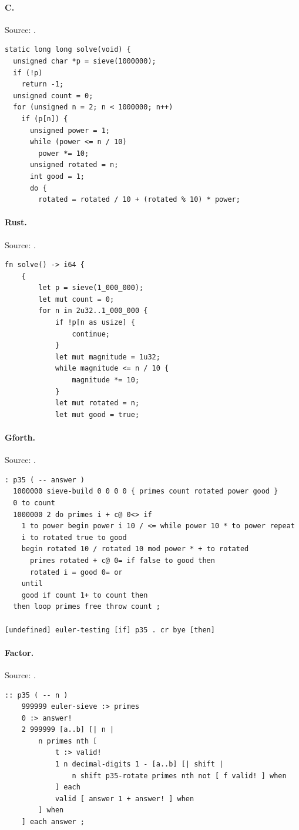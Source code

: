 \paragraph{C.} Source: .
\begin{lstlisting}
static long long solve(void) {
  unsigned char *p = sieve(1000000);
  if (!p)
    return -1;
  unsigned count = 0;
  for (unsigned n = 2; n < 1000000; n++)
    if (p[n]) {
      unsigned power = 1;
      while (power <= n / 10)
        power *= 10;
      unsigned rotated = n;
      int good = 1;
      do {
        rotated = rotated / 10 + (rotated % 10) * power;
\end{lstlisting}

\paragraph{Rust.} Source: .
\begin{lstlisting}
fn solve() -> i64 {
    {
        let p = sieve(1_000_000);
        let mut count = 0;
        for n in 2u32..1_000_000 {
            if !p[n as usize] {
                continue;
            }
            let mut magnitude = 1u32;
            while magnitude <= n / 10 {
                magnitude *= 10;
            }
            let mut rotated = n;
            let mut good = true;
\end{lstlisting}

\paragraph{Gforth.} Source: .
\begin{lstlisting}
: p35 ( -- answer )
  1000000 sieve-build 0 0 0 0 { primes count rotated power good }
  0 to count
  1000000 2 do primes i + c@ 0<> if
    1 to power begin power i 10 / <= while power 10 * to power repeat
    i to rotated true to good
    begin rotated 10 / rotated 10 mod power * + to rotated
      primes rotated + c@ 0= if false to good then
      rotated i = good 0= or
    until
    good if count 1+ to count then
  then loop primes free throw count ;

[undefined] euler-testing [if] p35 . cr bye [then]
\end{lstlisting}

\paragraph{Factor.} Source: .
\begin{lstlisting}
:: p35 ( -- n )
    999999 euler-sieve :> primes
    0 :> answer!
    2 999999 [a..b] [| n |
        n primes nth [
            t :> valid!
            1 n decimal-digits 1 - [a..b] [| shift |
                n shift p35-rotate primes nth not [ f valid! ] when
            ] each
            valid [ answer 1 + answer! ] when
        ] when
    ] each answer ;
\end{lstlisting}

